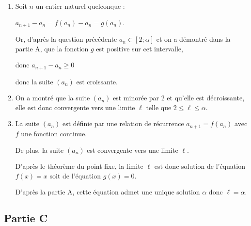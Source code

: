 \begin{enumerate}
	\item  Soit $n$ un entier naturel quelconque :

	$a_{n+1}-a_n= f\left(a_n\right)-a_n = g\left(a_n\right)$.

	Or, d'après la question précédente $a_n \in [2; \alpha]$ et  on a démontré dans la partie A, que la fonction $g$ est positive sur cet intervalle,

	donc $a_{n+1}-a_n\geqslant 0$

	donc la suite $(a_{n})$ est croissante.

	\item  On a montré que la suite $(a_{n})$  est minorée par 2 et qu'elle est décroissante, elle est donc convergente vers une limite $\ell$ telle que $2 \leqslant\ell \leqslant \alpha$.

	\item La suite $(a_{n})$ est définie par une relation de récurrence $a_{n+1}=f(a_n)$ avec $f$ une fonction continue.

	De plus, la suite $(a_{n})$ est convergente vers une limite $\ell$.

	D'après le théorème du point fixe, la limite $\ell$ est donc solution de l'équation $f(x)=x$ soit de l'équation $g(x)=0$.

	D'après la partie A, cette équation admet une unique solution $\alpha$ donc $\ell = \alpha$.

\end{enumerate}

\subsection*{Partie C}

